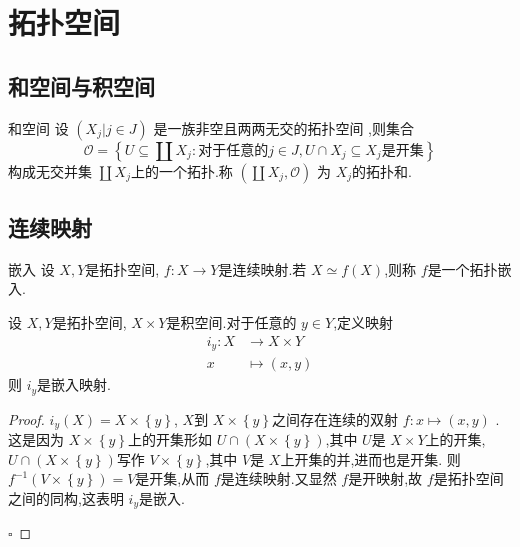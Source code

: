 \documentclass[../../几何与拓扑.tex]{subfiles}
\begin{document}
    

\chapter{拓扑空间}

\section{和空间与积空间}

\begin{definition}{和空间}
    设 \(  \left( X_{j}| j \in J \right)   \) 是一族非空且两两无交的拓扑空间 ,则集合 \[
    \mathcal{O} =  \left\{ U\subseteq \coprod X_{j}:\text{对于任意的}j \in J, U\cap  X_{j} \subseteq X_{j}\text{是开集} \right\}
    \]构成无交并集 \(  \coprod X_{j}  \)上的一个拓扑.称 \(  \left( \coprod X_{j}, \mathcal{O} \right)   \)  为 \(  X_{j}  \)的拓扑和. 
\end{definition}



\section{连续映射}

\begin{definition}{嵌入}
    设 \(  X,Y  \)是拓扑空间, \(  f:X \to Y  \)是连续映射.若 \(  X \simeq f\left( X \right)   \),则称 \(  f  \)是一个拓扑嵌入.    
\end{definition}

\begin{example}
    设 \(  X,Y  \)是拓扑空间, \(  X\times Y  \)是积空间.对于任意的 \(  y \in Y  \),定义映射 \[
\begin{aligned}
 i _{y}: X &\to X\times Y\\ 
   x& \mapsto \left( x,y \right) 
\end{aligned}
\]   则 \(  i_{y}  \)是嵌入映射. 
\end{example}
\begin{proof}

    \(  i_{y}\left( X \right) =  X\times \left\{ y \right\}   \), \(  X  \)到 \(  X\times  \left\{ y \right\}  \)之间存在连续的双射 \( f: x\mapsto\left( x,y \right)   \) .
    这是因为 \(  X\times \left\{ y \right\}  \)上的开集形如 \(  U\cap \left( X\times \left\{ y \right\} \right)  \),其中 \(   U \)是 \(  X\times Y  \)上的开集, \(  U \cap \left( X \times \left\{ y \right\} \right)   \)写作 \(  V\times \left\{ y \right\}  \),其中 \(  V  \)是 \(  X  \)上开集的并,进而也是开集.
    则 \(  f^{-1} \left( V\times \left\{ y \right\} \right)= V   \)是开集,从而 \(  f  \)是连续映射.又显然 \(  f  \)是开映射,故 \(  f  \)是拓扑空间之间的同构,这表明 \(  i_{y}  \)是嵌入.                

    \hfill $\square$
\end{proof}
\end{document}
